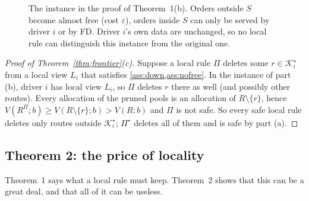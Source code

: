 \documentclass[11pt]{article}
\theoremstyle{definition}
\theoremstyle{remark}
\newcommand{\Ks}{\mathcal{K}^{\star}}
\begin{document}
\begin{figure}[!htbp]
\centering
{}
\caption{The instance in the proof of Theorem~1(b). Orders outside $S$ become
almost free (cost $\varepsilon$), orders inside $S$ can only be served by
driver $i$ or by FD. Driver $i$'s own data are unchanged, so no local rule can
distinguish this instance from the original one.}
\label{fig:helpers}
\end{figure}

\begin{proof}[Proof of Theorem~\ref{thm:frontier}(c)]
Suppose a local rule $\Pi$ deletes some $r\in\Ks_i$ from a local view $L_i$
that satisfies \cref{ass:down,ass:nofree}. In the instance of part (b), driver
$i$ has local view $L_i$, so $\Pi$ deletes $r$ there as well (and possibly
other routes). Every allocation of the pruned pools is an allocation of
$R\setminus\{r\}$, hence $V(R^\Pi;b)\ge V(R\setminus\{r\};b)>V(R;b)$ and $\Pi$ is
not safe. So every safe local rule deletes only routes outside $\Ks_i$;
$\Pi^\star$ deletes all of them and is safe by part (a).
\end{proof}

\subsection{Theorem 2: the price of locality}
\label{sec:thm2}

Theorem~1 says what a local rule must keep. Theorem~2 shows that this can be a
great deal, and that all of it can be useless.
\end{document}
